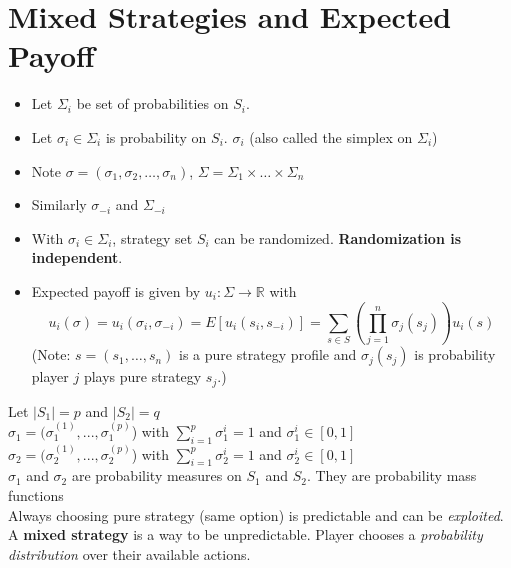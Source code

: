 \documentclass[../Main.tex]{subfiles}
\begin{document}
\section*{Mixed Strategies and Expected Payoff}

\begin{itemize}
    \item Let $\Sigma_i$ be set of probabilities on $S_i$.
    \item Let $\sigma_i \in \Sigma_i$ is probability on $S_i$. $\sigma_i$ (also called the simplex on $\Sigma_i$)
    \item Note $\sigma = (\sigma_1, \sigma_2, \dots, \sigma_n)$, $\Sigma = \Sigma_1 \times \dots \times \Sigma_n$
    \item Similarly $\sigma_{-i}$ and $\Sigma_{-i}$
    \item With $\sigma_i \in \Sigma_i$, strategy set $S_i$ can be randomized. \textbf{Randomization is independent}.
    \item Expected payoff is given by $u_i : \Sigma \rightarrow \mathbb{R}$ with
    \[
        u_i(\sigma) = u_i(\sigma_i, \sigma_{-i}) = E[u_i(s_i, s_{-i})] = \sum_{s \in S} \left( \prod_{j=1}^{n} \sigma_j(s_j) \right) u_i(s)
    \]
    (Note: $s=(s_1, \dots, s_n)$ is a pure strategy profile and $\sigma_j(s_j)$ is probability player $j$ plays pure strategy $s_j$.)
\end{itemize}

Let $|S_1| = p$ and $|S_2|=q$\\

$\sigma_1 = (\sigma^{(1)}_1,...,\sigma^{(p)}_1$) with $\sum^p_{i=1} \sigma^{i}_1 = 1$ and $ \sigma^{i}_1 \in [0,1]$\\

$\sigma_2 = (\sigma^{(1)}_2,...,\sigma^{(p)}_2$) with $\sum^p_{i=1} \sigma^{i}_2 = 1$ and $ \sigma^{i}_2 \in [0,1]$\\

$\sigma_1$ and $\sigma_2$ are probability measures on $S_1$ and $S_2$. They are probability mass functions\\

Always choosing pure strategy (same option) is predictable and can be \textit{exploited}. A \textbf{mixed strategy} is a way to be unpredictable. Player chooses a \textit{probability distribution} over their available actions.\\
\end{document}
